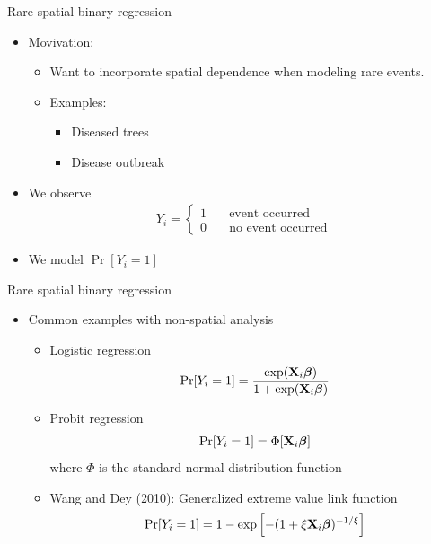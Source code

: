 \documentclass{beamer}
\begin{document}
\begin{frame}{Rare spatial binary regression}
  \begin{itemize} \setlength{\itemsep}{0.5em}
    \item Movivation:
    \begin{itemize}
      \item Want to incorporate spatial dependence when modeling rare events.
      \item Examples:
      \begin{itemize}
        \item Diseased trees
        \item Disease outbreak
      \end{itemize}
    \end{itemize}
    \item We observe
    \begin{align*}
      Y_i = \left\{ \begin{array}{ll}
        1 \quad & \text{event occurred}\\
        0 \quad & \text{no event occurred}
      \end{array} \right.
    \end{align*}
    \item We model $\Pr[Y_i = 1]$
  \end{itemize}
\end{frame}

\begin{frame}{Rare spatial binary regression}
  \begin{itemize} \setlength{\itemsep}{0.5em}
    \item Common examples with non-spatial analysis
    \begin{itemize}
      \item Logistic regression
      \begin{align*}
        \Pr[Y_i = 1] = \frac{ \exp(\mbox{\bf X}_i \mbox{\boldmath $\beta$}) }{ 1 + \exp(\mbox{\bf X}_i \mbox{\boldmath $\beta$})}
      \end{align*}
      \item Probit regression
      \begin{align*}
        \Pr[Y_i = 1] = \Phi[\mbox{\bf X}_i \mbox{\boldmath $\beta$}]
      \end{align*}
      where $\Phi$ is the standard normal distribution function
      \item Wang and Dey (2010): Generalized extreme value link function
      \begin{align*}
        \Pr[Y_i = 1] = 1 - \exp\left[-(1 + \xi \mbox{\bf X}_i \mbox{\boldmath $\beta$})^{-1 / \xi} \right]
      \end{align*}
    \end{itemize}
  \end{itemize}
\end{frame}
\end{document}
